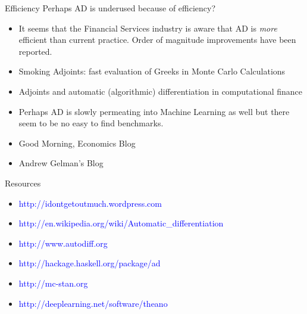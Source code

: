 \documentclass{beamer}
\begin{document}
\begin{frame}[fragile]{Efficiency}
Perhaps AD is underused because of efficiency?

\begin{itemize}
\pause
\item
It seems that the Financial Services industry is aware that AD is {\em
  more} efficient than current practice. Order of magnitude
improvements have been reported.
\pause
\item
Smoking Adjoints: fast evaluation of Greeks in Monte Carlo Calculations
\pause
\item
Adjoints and automatic (algorithmic) differentiation in computational finance
\pause
\item
Perhaps AD is slowly permeating into Machine Learning as well but
there seem to be no easy to find benchmarks.
\pause
\item
Good Morning, Economics Blog
\pause
\item
Andrew Gelman's Blog
\end{itemize}
\end{frame}

\begin{frame}[fragile]{Resources}
\begin{itemize}
\item \textcolor{blue}{http://idontgetoutmuch.wordpress.com}
\item
  \textcolor{blue}{http://en.wikipedia.org/wiki/Automatic\_differentiation}
\item \textcolor{blue}{http://www.autodiff.org}
\item \textcolor{blue}{http://hackage.haskell.org/package/ad}
\item \textcolor{blue}{http://mc-stan.org}
\item \textcolor{blue}{http://deeplearning.net/software/theano}
\end{itemize}
\end{frame}
\end{document}
